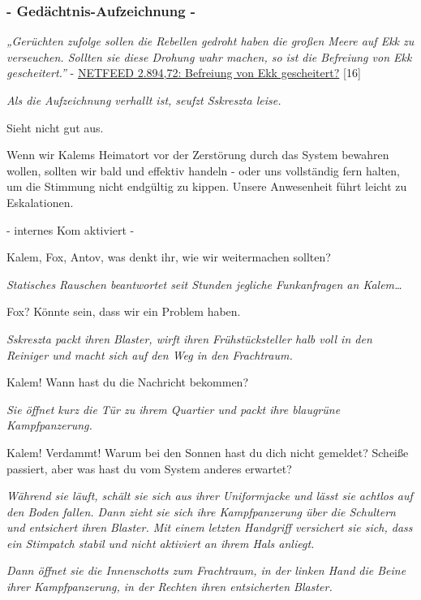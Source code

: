 \documentclass[11pt]{article}
\begin{document}
\subsubsection{- Gedächtnis-Aufzeichnung -}

\emph{„Gerüchten zufolge sollen die Rebellen gedroht haben die großen
Meere auf Ekk zu verseuchen. Sollten sie diese Drohung wahr machen, so
ist die Befreiung von Ekk gescheitert.''} -
\href{http://1w6.org/deutsch/welten/raumzeit/netfeed-archiv/netfeed-flag-news/local/netfeed-289472-befreiung-von-ekk-gesc}{NETFEED
2.894,72: Befreiung von Ekk gescheitert?} {[}16{]}

\emph{Als die Aufzeichnung verhallt ist, seufzt Sskreszta leise.}

Sieht nicht gut aus.

Wenn wir Kalems Heimatort vor der Zerstörung durch das System bewahren
wollen, sollten wir bald und effektiv handeln - oder uns vollständig
fern halten, um die Stimmung nicht endgültig zu kippen. Unsere
Anwesenheit führt leicht zu Eskalationen.

- internes Kom aktiviert -

Kalem, Fox, Antov, was denkt ihr, wie wir weitermachen sollten?

\emph{Statisches Rauschen beantwortet seit Stunden jegliche Funkanfragen
an Kalem\ldots{}}

Fox? Könnte sein, dass wir ein Problem haben.

\emph{Sskreszta packt ihren Blaster, wirft ihren Frühstücksteller halb
voll in den Reiniger und macht sich auf den Weg in den Frachtraum.}

Kalem! Wann hast du die Nachricht bekommen?

\emph{Sie öffnet kurz die Tür zu ihrem Quartier und packt ihre blaugrüne
Kampfpanzerung.}

Kalem! Verdammt! Warum bei den Sonnen hast du dich nicht gemeldet?
Scheiße passiert, aber was hast du vom System anderes erwartet?

\emph{Während sie läuft, schält sie sich aus ihrer Uniformjacke und
lässt sie achtlos auf den Boden fallen. Dann zieht sie sich ihre
Kampfpanzerung über die Schultern und entsichert ihren Blaster. Mit
einem letzten Handgriff versichert sie sich, dass ein Stimpatch stabil
und nicht aktiviert an ihrem Hals anliegt.}

\emph{Dann öffnet sie die Innenschotts zum Frachtraum, in der linken
Hand die Beine ihrer Kampfpanzerung, in der Rechten ihren entsicherten
Blaster.}
\end{document}
